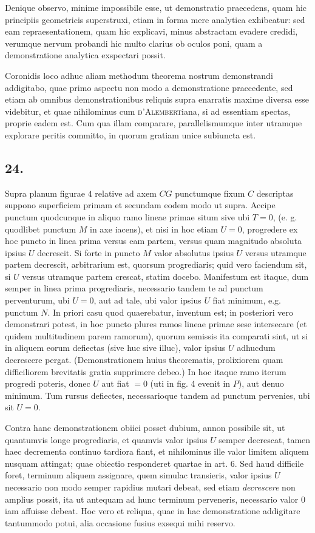 \documentclass[14pt]{memoir}
\theoremstyle{plain}
\theoremstyle{remark}
\begin{document}
Denique observo, minime impossibile esse, ut demonstratio praecedens, quam hic principiis geometricis superstruxi, etiam in forma mere analytica exhibeatur: sed eam repraesentationem, quam hic explicavi, minus abstractam evadere credidi, verumque nervum probandi hic multo clarius ob oculos poni, quam a demonstratione analytica exspectari possit. 

Coronidis loco adhuc aliam methodum theorema nostrum demonstrandi addigitabo, quae primo aspectu non modo a demonstratione praecedente, sed etiam ab omnibus demonstrationibus reliquis supra enarratis maxime diversa esse videbitur, et quae nihilominus cum \textsc{d'Alembert}iana, si ad essentiam spectas, proprie eadem est. Cum qua illam comparare, parallelismumque inter utramque explorare peritis committo, in quorum gratiam unice subiuncta est.

\subsection*{24.}
 
Supra planum figurae \(4\) relative ad axem \(CG\) punctumque fixum \(C\) descriptas suppono superficiem primam et secundam eodem modo ut supra.  Accipe punctum quodcunque in aliquo ramo lineae primae situm sive ubi \(T= 0\), (e. g. quodlibet punctum \(M\) in axe iacens), et nisi in hoc etiam \(U= 0\), progredere ex hoc puncto in linea prima versus eam partem, versus quam magnitudo absoluta ipsius \(U\) decrescit. Si forte in puncto \(M\) valor absolutus ipsius \(U\) versus utramque partem decrescit, arbitrarium est, quorsum progrediaris; quid vero faciendum sit, si \(U\) versus utramque partem crescat, statim docebo. Manifestum est itaque, dum semper in linea prima progrediaris, necessario tandem te ad punctum perventurum, ubi \(U = 0\), aut ad tale, ubi valor ipsius \(U\) fiat minimum, e.g. punctum \(N\). In priori casu quod quaerebatur, inventum est; in posteriori vero demonstrari potest, in hoc puncto plures ramos lineae primae sese intersecare (et quidem multitudinem parem ramorum), quorum semissis ita comparati sint, ut si in aliquem eorum defiectas (sive huc sive illuc), valor ipsius \(U\) adhucdum decrescere pergat. (Demonstrationem huius theorematis, prolixiorem quam difficiliorem brevitatis gratia supprimere debeo.) In hoc itaque ramo iterum progredi poteris, donec \(U\) aut fiat \(= 0\) (uti in fig. 4 evenit in \(P\)), aut denuo minimum. Tum rursus defiectes, necessarioque tandem ad punctum pervenies, ubi sit  \(U = 0\).

Contra hanc demonstrationem obiici posset dubium, annon possibile sit, ut quantumvis longe progrediaris, et quamvis valor ipsius \(U\) semper decrescat, tamen haec decrementa continuo tardiora fiant, et nihilominus ille valor limitem aliquem nusquam attingat; quae obiectio responderet quartae in art. 6. Sed haud difficile foret, terminum aliquem assignare, quem simulac transieris, valor ipsius \(U\) necessario non modo semper rapidius mutari debeat, sed etiam \textit{decrescere} non amplius possit, ita ut antequam ad hunc terminum perveneris, necessario valor \(0\) iam affuisse debeat. Hoc vero et reliqua, quae in hac demonstratione addigitare tantummodo potui, alia occasione fusius exsequi mihi reservo.
\end{document}
